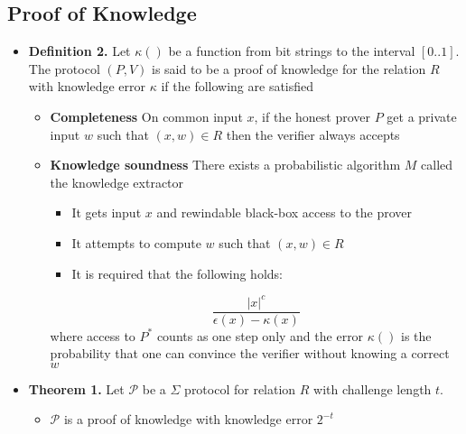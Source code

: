 \subsection{Proof of Knowledge}
\begin{itemize}
  \item \textbf{Definition 2.} Let $\kappa()$ be a function from bit strings to the interval $[0..1]$. The protocol $(P,V)$ is said to be a proof of knowledge for the relation $R$ with knowledge error $\kappa$ if the following are satisfied
  \begin{itemize}
  	\item \textbf{Completeness} On common input $x$, if the honest prover $P$ get a private input $w$ such that $(x,w) \in R$ then the verifier always accepts
  	\item \textbf{Knowledge soundness} There exists a probabilistic algorithm $M$ called the knowledge extractor
    \begin{itemize}
  		\item It gets input $x$ and rewindable black-box access to the prover
  		\item It attempts to compute $w$ such that $(x,w) \in R$
  		\item It is required that the following holds:
    \end{itemize}
    \[
      \frac{|x|^c}{\epsilon(x)-\kappa(x)} 
    \]
    where access to $P^*$ counts as one step only and the error $\kappa()$ is the probability that one can convince the verifier without knowing a correct $w$ 
  \end{itemize}

  \item \textbf{Theorem 1.} Let $\mathcal P$ be a $\Sigma$ protocol for relation $R$ with challenge length $t$.
  \begin{itemize}
  	\item $\mathcal P$ is a proof of knowledge with knowledge error $2^{-t}$ 
  \end{itemize}
\end{itemize}

